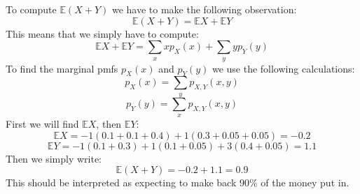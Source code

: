 To compute $\mathbb{E}(X+Y)$ we have to make the following observation:
$$
\mathbb{E}(X+Y) = \mathbb{E}X + \mathbb{E}Y
$$
This means that we simply have to compute:
$$
\mathbb{E}X + \mathbb{E}Y = \sum_x xp_X(x) + \sum_y yp_Y(y)
$$
To find the marginal pmfs $p_X(x)$ and $p_Y(y)$ we use the following calculations:
$$
p_X(x) = \sum_y p_{X,Y}(x,y)
$$
$$
p_Y(y) = \sum_x p_{X,Y}(x,y)
$$
First we will find $\mathbb{E}X$, then $\mathbb{E}Y$:
$$
\mathbb{E}X = -1(0.1+0.1+0.4) + 1(0.3+0.05+0.05) = -0.2
$$
$$
\mathbb{E}Y = -1(0.1+0.3) + 1(0.1+0.05) + 3(0.4+0.05) = 1.1
$$
Then we simply write:
$$
\mathbb{E}(X+Y) = -0.2 + 1.1 = 0.9
$$
This should be interpreted as expecting to make back $90\%$ of the money put in.